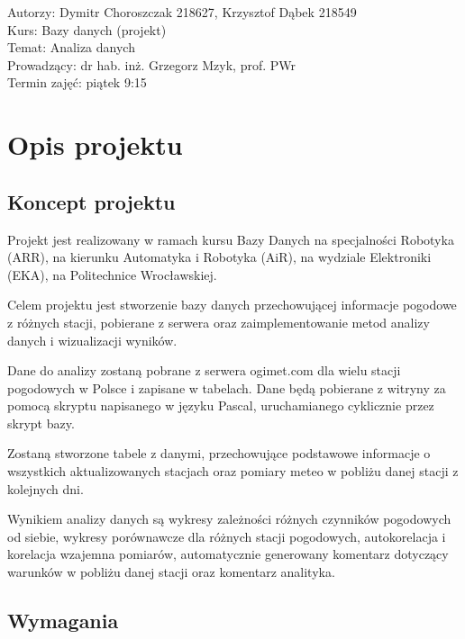 \documentclass[12pt,a4paper]{article}
\begin{document}
\vspace{20pt}
 
\begin{flushleft}
Autorzy: Dymitr Choroszczak 218627, Krzysztof Dąbek 218549\\
Kurs: Bazy danych (projekt)\\
Temat: Analiza danych\\
Prowadzący: dr hab. inż. Grzegorz Mzyk, prof. PWr\\
Termin zajęć: piątek 9:15\\
\end{flushleft} 
 
\newpage
 
\tableofcontents
 
\newpage
 
\section{Opis projektu}
 
\subsection{Koncept projektu}
\normalsize
Projekt jest realizowany w ramach kursu Bazy Danych na specjalności Robotyka (ARR), na kierunku Automatyka i Robotyka (AiR), na wydziale Elektroniki (EKA), na Politechnice Wrocławskiej.\par
Celem projektu jest stworzenie bazy danych przechowującej informacje pogodowe z różnych stacji, pobierane z serwera oraz zaimplementowanie metod analizy danych i wizualizacji wyników.\par
Dane do analizy zostaną pobrane z serwera ogimet.com dla wielu stacji pogodowych w Polsce i zapisane w tabelach. Dane będą pobierane z witryny za pomocą skryptu napisanego w języku Pascal, uruchamianego cyklicznie przez skrypt bazy.\par
Zostaną stworzone tabele z danymi, przechowujące podstawowe informacje o wszystkich aktualizowanych stacjach oraz pomiary meteo w pobliżu danej stacji z kolejnych dni.\par
Wynikiem analizy danych są wykresy zależności różnych czynników pogodowych od siebie, wykresy porównawcze dla różnych stacji pogodowych, autokorelacja i korelacja wzajemna pomiarów, automatycznie generowany komentarz dotyczący warunków w pobliżu danej stacji oraz komentarz analityka.
\newpage
\subsection{Wymagania}
\end{document}
